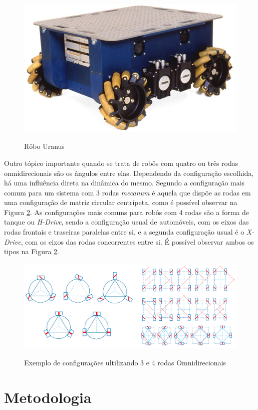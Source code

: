 \documentclass[deposito, acronym, symbols]{fei}
\begin{document}
\begin{figure}[!htb]
    \centering
    \caption{Rôbo Uranus}
    \includegraphics[width=0.45\linewidth]{Imagens/Exemplo de robo.jpg}
    \label{fig:Exemploderobo}
\end{figure}

Outro tópico importante quando se trata de robôs com quatro ou três rodas omnidirecionais são os ângulos entre elas. Dependendo da configuração escolhida, há uma influência direta na dinâmica do mesmo. Segundo \textcite{li2019topological} a configuração mais comum para um sistema com 3 rodas \textit{mecanum} é aquela que dispõe as rodas em uma configuração de matriz circular centrípeta, como é possível observar na Figura \ref{fig:configrodas}. As configurações mais comuns para robôs com 4 rodas são a forma de tanque ou \textit{H-Drive}, sendo a configuração usual de automóveis, com os eixos das rodas frontais e traseiras paralelas entre si, e a segunda configuração usual é o \textit{X-Drive}, com os eixos das rodas concorrentes entre si. É possível observar ambos os tipos na Figura \ref{fig:configrodas}.


\begin{figure}[!htb]
        \centering
        \caption{Exemplo de configurações ultilizando 3 e 4 rodas Omnidirecionais}
        \includegraphics[width=0.9\linewidth]{Imagens/Configurações de rodas.png}
        \label{fig:configrodas}      
\end{figure}


\chapter{Metodologia}
\end{document}
